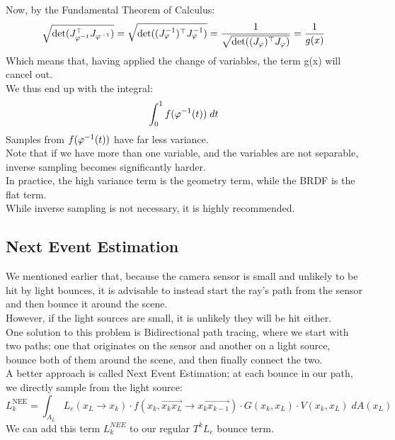 \documentclass[12pt]{article}
\begin{document}
Now, by the Fundamental Theorem of Calculus:
\[ \sqrt{\det(J_{\varphi^{-1}}^\top J_{\varphi^{-1}})}
= \sqrt{\det((J_{\varphi}^{-1})^\top J_{\varphi}^{-1})}
= \dfrac{1}{\sqrt{\det((J_{\varphi})^\top J_{\varphi})}}
= \dfrac{1}{g(x)}\]
Which means that, having applied the
change of variables, the term g(x)
will cancel out. \\

We thus end up with the integral:
\[ \int_0^1 f(\varphi^{-1}(t)) \; dt \]
Samples from $f(\varphi^{-1}(t))$
have far less variance. \\

Note that if we have more than one variable,
and the variables are not separable,
inverse sampling becomes significantly harder. \\

In practice, the high variance term is
the geometry term, while the BRDF is the flat term. \\

While inverse sampling is not necessary, 
it is highly recommended. \\

\newpage

\subsection*{Next Event Estimation}

We mentioned earlier that, because the camera
sensor is small and unlikely to be hit by light
bounces, it is advisable to instead start the
ray's path from the sensor and then bounce
it around the scene. \\

However, if the light sources are small, it is unlikely
they will be hit either. \\

One solution to this problem is Bidirectional path
tracing, where we start with two paths;
one that originates on the sensor and another on
a light source, bounce both of them around the scene,
and then finally connect the two. \\

A better approach is called Next Event Estimation;
at each bounce in our path, we directly sample
from the light source:
\[ L_k^{\text{NEE}} = \int_{A_L} 
L_e(x_L \to x_k) \cdot 
f(x_k, \overrightarrow{x_k x_L} \to 
\overrightarrow{x_k x_{k-1}}) \cdot 
G(x_k, x_L) \cdot 
V(x_k, x_L) \; dA(x_L) \]
We can add this term $L_k^{NEE}$
to our regular $T^k L_e$ bounce term. \\
\end{document}
